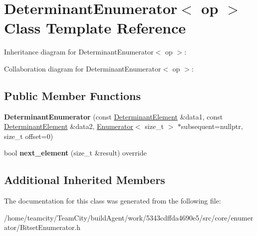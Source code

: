 \hypertarget{classDeterminantEnumerator}{}\section{Determinant\+Enumerator$<$ op $>$ Class Template Reference}
\label{classDeterminantEnumerator}


Inheritance diagram for Determinant\+Enumerator$<$ op $>$\+:


Collaboration diagram for Determinant\+Enumerator$<$ op $>$\+:
\subsection*{Public Member Functions}
\begin{DoxyCompactItemize}
\item 
{\bfseries Determinant\+Enumerator} (const \hyperlink{classDeterminantElement}{Determinant\+Element} \&data1, const \hyperlink{classDeterminantElement}{Determinant\+Element} \&data2, \hyperlink{classEnumerator}{Enumerator}$<$ size\+\_\+t $>$ $\ast$subsequent=nullptr, size\+\_\+t offset=0)\hypertarget{classDeterminantEnumerator_a30c99d5c81de8d12caf012f14c1af129}{}\label{classDeterminantEnumerator_a30c99d5c81de8d12caf012f14c1af129}

\item 
bool {\bfseries next\+\_\+element} (size\+\_\+t \&result) override\hypertarget{classDeterminantEnumerator_ab3027854ee62ae607d7326f3cf65553a}{}\label{classDeterminantEnumerator_ab3027854ee62ae607d7326f3cf65553a}

\end{DoxyCompactItemize}
\subsection*{Additional Inherited Members}


The documentation for this class was generated from the following file\+:\begin{DoxyCompactItemize}
\item 
/home/teamcity/\+Team\+City/build\+Agent/work/5343cdffda4690e5/src/core/enumerator/Bitset\+Enumerator.\+h\end{DoxyCompactItemize}
